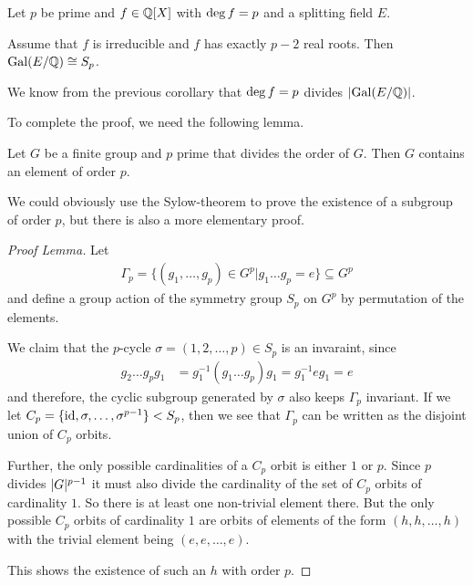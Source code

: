 \begin{thm}[]\label{thm:p-minus-two-roots}
  Let $p$ be prime and $f \in \mathbb{Q}[X]$ with $\operatorname{deg} f = p$ and a splitting field $E$.

  Assume that $f$ is irreducible and $f$ has exactly $p-2$ real roots. 
  Then $\operatorname{Gal}(E/\mathbb{Q}) \cong S_p$.
\end{thm}
We know from the previous corollary that $\operatorname{deg} f = p$ divides $\abs{\Gal(E/\Q)}$.

To complete the proof, we need the following lemma.
\begin{lem}[Cauchy]
  Let $G$ be a finite group and $p$ prime that divides the order of $G$. 
  Then $G$ contains an element of order $p$.
\end{lem}
We could obviously use the Sylow-theorem to prove the existence of a subgroup of order $p$, but there is also a more elementary proof.
\begin{proof}[Proof Lemma]
  Let
  \begin{align*}
    \Gamma_p = \{
      (g_1, \ldots, g_p) \in G^{p} \big\vert g_1 \dots g_p = e
    \} \subseteq G^{p}
  \end{align*}
  and define a group action of the symmetry group $S_p$ on $G^{p}$ by permutation of the elements.

  We claim that the $p$-cycle $\sigma = (1, 2, \ldots, p) \in S_p$ is an invaraint, since
  \begin{align*}
    g_{2}\dots g_{p}g_1 &= g_1^{-1}(g_{1}\dots g_{p})g_1 = g_1^{-1} e g_1 = e 
  \end{align*}
  and therefore, the cyclic subgroup generated by $\sigma$ also keeps $\Gamma_p$ invariant.
  If we let $C_p = \{\operatorname{id}, \sigma, \ldots, \sigma^{p-1}\} < S_p$, then we see that $\Gamma_p$ can be written as the disjoint union of $C_p$ orbits.

  Further, the only possible cardinalities of a $C_p$ orbit is either $1$ or $p$. 
  Since $p$ divides $\vert G\vert^{p-1}$ it must also divide the cardinality of the set of $C_p$ orbits of cardinality $1$. 
  So there is at least one non-trivial element there.
  But the only possible $C_p$ orbits of cardinality $1$ are orbits of elements of the form $(h,h, \ldots,h)$ with the trivial element being $(e,e,\ldots,e)$.

  This shows the existence of such an $h$ with order $p$.
\end{proof}

